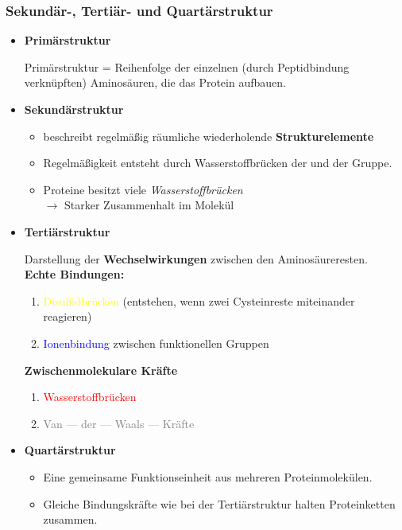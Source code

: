 \documentclass[a4paper, 12pt]{scrartcl}
\begin{document}
\subsubsection{Sekundär-, Tertiär- und Quartärstruktur}
\begin{itemize}
    \item \textbf{Primärstruktur}

        Primärstruktur = Reihenfolge der einzelnen (durch Peptidbindung
        verknüpften) Aminosäuren, die das Protein aufbauen.

    \item \textbf{Sekundärstruktur}

        \begin{itemize}
            \item beschreibt regelmäßig räumliche wiederholende \textbf{Strukturelemente}
            \item Regelmäßigkeit entsteht durch Wasserstoffbrücken der 
                und der
                Gruppe.
            \item Proteine besitzt viele \textit{Wasserstoffbrücken}\\
                $ \rightarrow$ Starker Zusammenhalt im Molekül
        \end{itemize}

    \item \textbf{Tertiärstruktur}

        Darstellung der \textbf{Wechselwirkungen} zwischen den
        Aminosäureresten.\\
        \textbf{Echte Bindungen:}
        \begin{enumerate}
            \item \textcolor{yellow}{Disulfidbrücken} (entstehen, wenn zwei
                Cysteinreste miteinander reagieren)
            \item \textcolor{blue}{Ionenbindung} zwischen funktionellen Gruppen
        \end{enumerate}
        \textbf{Zwischenmolekulare Kräfte}
        \begin{enumerate}
            \item \textcolor{red}{Wasserstoffbrücken}
            \item \textcolor{gray}{Van --- der --- Waals --- Kräfte}
        \end{enumerate}

    \item \textbf{Quartärstruktur}

        \begin{itemize}
            \item Eine gemeinsame Funktionseinheit aus mehreren
                Proteinmolekülen.
            \item Gleiche Bindungskräfte wie bei der Tertiärstruktur halten
                Proteinketten zusammen.
        \end{itemize}
\end{itemize}
\end{document}
